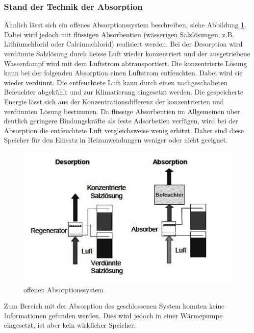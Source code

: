 \documentclass[11pt,a4paper]{scrartcl}
\begin{document}
\subsubsection{Stand der Technik der Absorption}

Ähnlich lässt sich ein offenes Absorptionssystem beschreiben, siehe Abbildung \ref{fig:offenessystemabsorption}. Dabei wird jedoch mit flüssigen Absorbentien (wässerigen Salzlösungen, z.B. Lithiumchlorid oder Calciumchlorid) realisiert werden. Bei der Desorption wird verdünnte Salzlösung durch heisse Luft wieder konzentriert und der ausgetriebene Wasserdampf wird mit dem Luftstrom abtransportiert. Die konzentrierte Lösung kann bei der folgenden Absorption einen Luftstrom entfeuchten. Dabei wird sie wieder verdünnt. Die entfeuchtete Luft kann durch einen nachgeschalteten Befeuchter abgekühlt und zur Klimatierung eingesetzt werden. Die gespeicherte Energie lässt sich aus der Konzentrationsdifferenz der konzentrierten und verdünnten Lösung bestimmen. Da flüssige Absorbentien im Allgemeinen über deutlich geringere Bindungskräfte als feste Adsorbetien verfügen, wird bei der Absorption die entfeuchtete Luft vergleichsweise wenig erhitzt. Daher sind diese Speicher für den Einsatz in Heizanwendungen weniger oder nicht geeignet.

\begin{figure}[h!]
\begin{center}
\includegraphics[scale=1]{images/offenessystemabsorption.jpg}
\caption{offenen Absorptionssystem}
\label{fig:offenessystemabsorption}
\end{center}
\end{figure}


Zum Bereich mit der Absorption des geschlossenen System konnten keine Informationen gefunden werden. Dies wird jedoch in einer Wärmepumpe eingesetzt, ist aber kein wirklicher Speicher.
\end{document}
